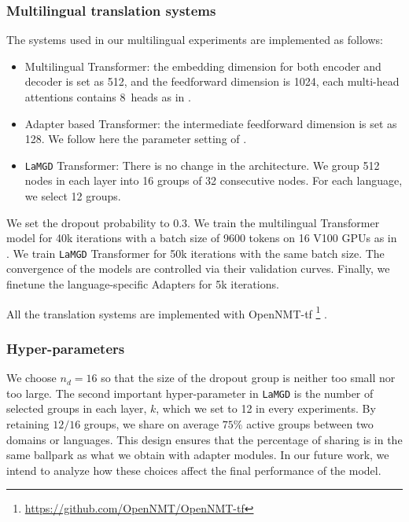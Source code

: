 \documentclass[11pt]{article}
\newcommand{\fyDone}[1]{\done[FY]\Todo[FY:]{\textcolor{orange}{#1}}}
\newcommand{\system}[1]{\texttt{{#1}}}
\begin{document}
\subsubsection{Multilingual translation systems}
The systems used in our multilingual experiments are implemented as follows:
\begin{itemize}
\item Multilingual Transformer: the embedding dimension for both encoder and decoder is set as 512, and the feedforward dimension is 1024, each multi-head attentions contains 8~heads as in \citep{Wang20balancing}.
\item Adapter based Transformer: the intermediate feedforward dimension is set as 128. We follow here the parameter setting of \citep{Gong21adaptive}.
\item \system{LaMGD} Transformer: There is no change in the architecture. We group 512 nodes in each layer into 16 groups of 32 consecutive nodes. For each language, we select 12 groups.
\end{itemize}

We set the dropout probability to 0.3. We train the multilingual Transformer model for 40k iterations with a batch size of 9600 tokens on 16 V100 GPUs as in \citet{Gong21adaptive}. We train \system{LaMGD} Transformer for 50k iterations with the same batch size. The convergence of the models are controlled via their validation curves. Finally, we finetune the language-specific Adapters for 5k iterations.

All the translation systems are implemented with OpenNMT-tf \footnote{\url{https://github.com/OpenNMT/OpenNMT-tf}} \cite{Klein17opennmt}.\fyDone{Fix this, add reference to framework if needed}

\subsubsection{Hyper-parameters}
\label{ssec:hyperparams}
We choose $n_d = 16$ so that the size of the dropout group is neither too small nor too large. The second important hyper-parameter in \system{LaMGD} is the number of selected groups in each layer, $k$, which we set to 12 in every experiments. By retaining $12/16$ groups, we share on average $75 \%$ active groups between two domains or languages. This design ensures that the percentage of sharing is in the same ballpark as what we obtain with adapter modules. In our future work, we intend to analyze how these choices affect the final performance of the model.
\end{document}
